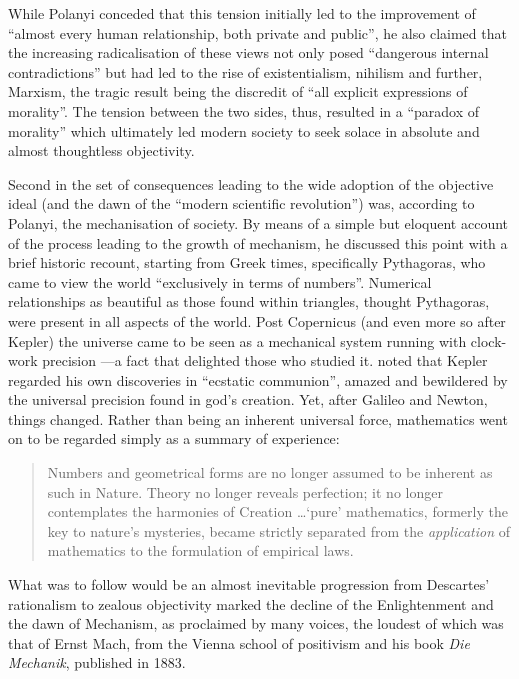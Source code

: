 While Polanyi conceded that this tension initially led to the improvement of ``almost every human relationship, both private and public'', he also claimed that the increasing radicalisation of these views not only posed ``dangerous internal contradictions'' \citep[p.58]{polanyi66} but had led to the rise of existentialism, nihilism and further, Marxism, the tragic result being the discredit of ``all explicit expressions of morality''. The tension between the two sides, thus, resulted in a ``paradox of morality'' which ultimately led modern society to seek solace in absolute and almost thoughtless objectivity.

Second in the set of consequences leading to the wide adoption of the objective ideal (and the dawn of the ``modern scientific revolution'') was, according to Polanyi, the mechanisation of society. By means of a simple but eloquent account of the process leading to the growth of mechanism, he discussed this point with a brief historic recount, starting from Greek times, specifically Pythagoras, who came to view the world ``exclusively in terms of numbers''. Numerical relationships as beautiful as those found within triangles, thought Pythagoras, were present in all aspects of the world. Post Copernicus (and even more so after Kepler) the universe came to be seen as a mechanical system running with clock-work precision ---a fact that delighted those who studied it. \citet[p.7]{polanyi58} noted that Kepler regarded his own discoveries in ``ecstatic communion'', amazed and bewildered by the universal precision found in god's creation. Yet, after Galileo and Newton, things changed. Rather than being an inherent universal force, mathematics went on to be regarded simply as a summary of experience:

\begin{quote}
Numbers and geometrical forms are no longer assumed to be inherent as such in Nature. Theory no longer reveals perfection; it no longer contemplates the harmonies of Creation \ldots `pure' mathematics, formerly the key to nature's mysteries, became strictly separated from the \emph{application} of mathematics to the formulation of empirical laws. \citep[p.28]{polanyi58}
\end{quote}

What was to follow would be an almost inevitable progression from Descartes' rationalism to zealous objectivity marked the decline of the Enlightenment and the dawn of Mechanism, as proclaimed by many voices, the loudest of which was that of Ernst Mach, from the Vienna school of positivism and his book \textit{Die Mechanik}, published in 1883. 


